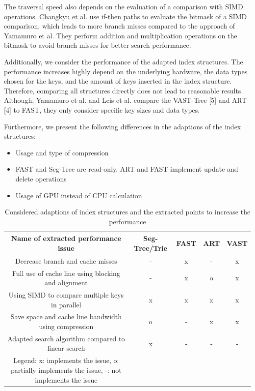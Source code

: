 \documentclass[conference]{IEEEtran}
\begin{document}
The traversal speed also depends on the evaluation of a comparison with SIMD operations. Changkyu et al. use if-then paths to evaluate the bitmask of a SIMD comparison, which leads to more branch misses compared to the approach of Yamamuro et al. They perform addition and multiplication operations on the bitmask to avoid branch misses for better search performance.

Additionally, we consider the performance of the adapted index structures. The performance increases highly depend on the underlying hardware, the data types chosen for the keys, and the amount of keys inserted in the index structure. Therefore, comparing all structures directly does not lead to reasonable results. Although, Yamamuro et al. and Leis et al. compare the VAST-Tree [5] and ART [4] to FAST, they only consider specific key sizes and data types. 

Furthermore, we present the following differences in the adaptions of the index structures:
\begin{itemize}
	\item Usage and type of compression
	\item FAST and Seg-Tree are read-only, ART and FAST implement update and delete operations
	\item Usage of GPU instead of CPU calculation
\end{itemize}
\begin{table}[htbp]
	\caption{Considered adaptions of index structures and the extracted points to increase the performance}
	\begin{center}
		\begin{tabular}{|c|c|c|c|c|}
			\hline
			\textbf{Name of extracted performance issue}&\textbf{Seg-Tree/Trie}&\textbf{FAST}&\textbf{ART}&\textbf{VAST}\\
			\hline
			Decrease branch and cache misses & - & x & - & x\\
			Full use of cache line using blocking and alignment & - & x & o & x\\
			Using SIMD to compare multiple keys in parallel & x & x & x & x\\
			Save space and cache line bandwidth using compression & o & - & x & x\\
			Adapted search algorithm compared to linear search & x & - & - & -\\
			\hline
			Legend: x: implements the issue, o: partially implements the issue, -: not implements the issue & & & &\\
			\hline
		\end{tabular}
		\label{tab1}
	\end{center}
\end{table}
\end{document}
